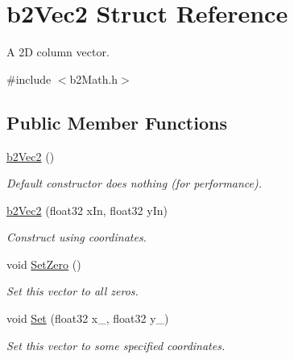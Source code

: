 \hypertarget{structb2Vec2}{}\section{b2\+Vec2 Struct Reference}
\label{structb2Vec2}


A 2D column vector.  




{\ttfamily \#include $<$b2\+Math.\+h$>$}

\subsection*{Public Member Functions}
\begin{DoxyCompactItemize}
\item 
\mbox{\label{structb2Vec2_a9171b31deb83af96872f99689939a12f}} 
\mbox{\hyperlink{structb2Vec2_a9171b31deb83af96872f99689939a12f}{b2\+Vec2}} ()
\begin{DoxyCompactList}\small\item\em Default constructor does nothing (for performance). \end{DoxyCompactList}\item 
\mbox{\label{structb2Vec2_a5d9a42aed33251a53c33a1ff7dd6be43}} 
\mbox{\hyperlink{structb2Vec2_a5d9a42aed33251a53c33a1ff7dd6be43}{b2\+Vec2}} (float32 x\+In, float32 y\+In)
\begin{DoxyCompactList}\small\item\em Construct using coordinates. \end{DoxyCompactList}\item 
\mbox{\label{structb2Vec2_a5c6cbe27cfb29c6dbb29b9a3285b88d0}} 
void \mbox{\hyperlink{structb2Vec2_a5c6cbe27cfb29c6dbb29b9a3285b88d0}{Set\+Zero}} ()
\begin{DoxyCompactList}\small\item\em Set this vector to all zeros. \end{DoxyCompactList}\item 
\mbox{\label{structb2Vec2_a4d61640a645e470a50b451307d8e94c3}} 
void \mbox{\hyperlink{structb2Vec2_a4d61640a645e470a50b451307d8e94c3}{Set}} (float32 x\+\_\+, float32 y\+\_\+)
\begin{DoxyCompactList}\small\item\em Set this vector to some specified coordinates. \end{DoxyCompactList}\item 

\end{DoxyCompactItemize}
